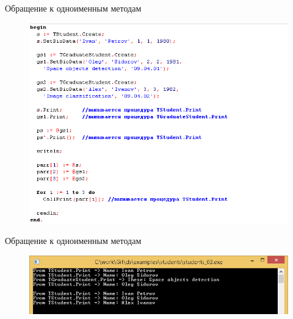 \documentclass{beamer}
\begin{document}
\begin{frame}{Обращение к одноименным методам}
\begin{figure}[h]
\centering
\includegraphics[scale=0.6]{images/lec06-pic21.png}
\end{figure}
\end{frame}

\begin{frame}{Обращение к одноименным методам}
\begin{figure}[h]
\centering
\includegraphics[scale=0.6]{images/lec06-pic22.png}
\end{figure}
\end{frame}
\end{document}
